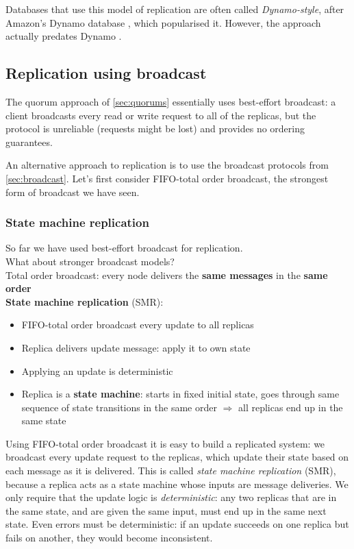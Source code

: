 Databases that use this model of replication are often called \emph{Dynamo-style}, after Amazon's Dynamo database \citep{DeCandia:2007}, which popularised it.
However, the approach actually predates Dynamo \citep{Attiya:1995}.

\subsection{Replication using broadcast}\label{sec:broadcast-replication}

The quorum approach of \autoref{sec:quorums} essentially uses best-effort broadcast: a client broadcasts every read or write request to all of the replicas, but the protocol is unreliable (requests might be lost) and provides no ordering guarantees.

An alternative approach to replication is to use the broadcast protocols from \autoref{sec:broadcast}.
Let's first consider FIFO-total order broadcast, the strongest form of broadcast we have seen.

\begin{frame}
    \label{s:smr}
    \frametitle{State machine replication}
    So far we have used best-effort broadcast for replication.\\
    What about stronger broadcast models?\\[1em]\pause
    Total order broadcast: every node delivers the \textbf{same messages} in the \textbf{same order}\\[1em]\pause
    \textbf{State machine replication} (SMR):
    \begin{itemize}
        \item FIFO-total order broadcast every update to all replicas
        \item Replica delivers update message: apply it to own state\pause
        \item Applying an update is deterministic\pause
        \item Replica is a \textbf{state machine}: starts in fixed initial state,
            goes through same sequence of state transitions in the same order
            $\Longrightarrow$ all replicas end up in the same state
    \end{itemize}
\end{frame}
\label{l:smr}

Using FIFO-total order broadcast it is easy to build a replicated system: we broadcast every update request to the replicas, which update their state based on each message as it is delivered.
This is called \emph{state machine replication} (SMR), because a replica acts as a state machine whose inputs are message deliveries.
We only require that the update logic is \emph{deterministic}: any two replicas that are in the same state, and are given the same input, must end up in the same next state.
Even errors must be deterministic: if an update succeeds on one replica but fails on another, they would become inconsistent.

